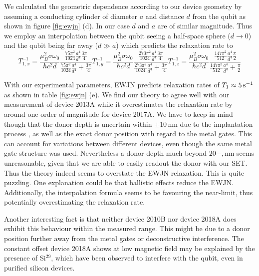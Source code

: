 We calculated the geometric dependence according to our device geometry by assuming a conducting cylinder of diameter $a$ and distance $d$ from the qubit as shown in figure \ref{fig:ewjn} (d). In our case $d$ and $a$ are of similar magnitude. Thus we employ an interpolation between the qubit seeing a half-space sphere ($d\rightarrow 0$) and the qubit being far away ($d\gg a$) which predicts the relaxation rate to 
\begin{subequations}
\begin{equation}
T_{1,x}^{-1}=\frac{\mu_B^2\sigma\omega_0}{\hbar c^2d}\frac{\frac{75\pi^2}{1024}\frac{a^4}{d^4}\frac{3\pi}{4}}{\frac{75\pi^2}{1024}\frac{a^4}{d^4}+\frac{3\pi}{4}}
\end{equation}
\begin{equation}
T_{1,y}^{-1}=\frac{\mu_B^2\sigma\omega_0}{\hbar c^2d}\frac{\frac{273\pi^2}{1024}\frac{a^4}{d^4}\frac{3\pi}{4}}{\frac{273\pi^2}{1024}\frac{a^4}{d^4}+\frac{3\pi}{4}}
\end{equation}
\begin{equation}
T_{1,z}^{-1}=\frac{\mu_B^2\sigma\omega_0}{\hbar c^2d}\frac{\frac{147\pi^2}{512}\frac{a^4}{d^4}\frac{\pi}{2}}{\frac{147\pi^2}{512}\frac{a^4}{d^4}+\frac{\pi}{2}}
\end{equation}
\end{subequations}

With our experimental parameters, EWJN predicts relaxation rates of $T_1\approx5\,\rm{s}^{-1}$ as shown in table \ref{fig:ewjn} (e). We find our theory to agree well with our measurement of device 2013A while it overestimates the relaxation rate by around one order of magnitude for device 2017A. We have to keep in mind though that the donor depth is uncertain within $\pm10\,$nm due to the implantation process \cite{VanDonkelaar2015}, as well as the exact donor position with regard to the metal gates. This can account for variations between different devices, even though the same metal gate structure was used. Nevertheless a donor depth much beyond $20-,$nm seems unreasonable, given that we are able to easily readout the donor with our SET. Thus the theory indeed seems to overstate the EWJN relaxation. This is quite puzzling. One explanation could be that ballistic effects reduce the EWJN. Additionally, the interpolation formula seems to be favouring the near-limit, thus potentially overestimating the relaxation rate. 

Another interesting fact is that neither device 2010B nor device 2018A does exhibit this behaviour within the measured range. This might be due to a donor position further away from the metal gates or deconstructive interference. %
The constant offset device 2018A shows at low magnetic field may be explained by the presence of Si$^{29}$, which have been observed to interfere with the qubit, even in purified silicon devices\cite{Morello2010}. 

